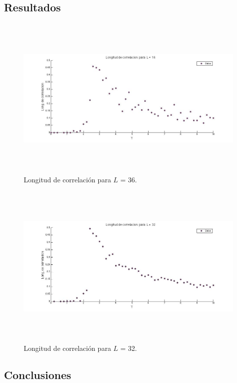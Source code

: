 \documentclass[a4paper,12pt]{article}
\begin{document}
\subsection{Resultados}

\begin{figure}[H]
\begin{center}
\includegraphics[height=8cm]{../graficos/Lcorr_L16.jpg}
\caption[width=5cm]{Longitud de correlaci\'on para $L$ = 36.}
\end{center}
\end{figure}

\begin{figure}[H]
\begin{center}
\includegraphics[height=8cm]{../graficos/Lcorr_L32.jpg}
\caption[width=5cm]{Longitud de correlaci\'on para $L$ = 32.}
\end{center}
\end{figure}

\subsection{Conclusiones}
\end{document}
